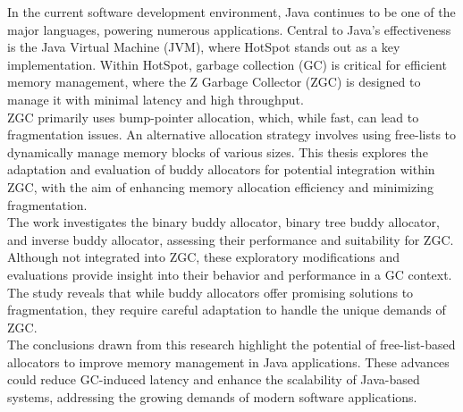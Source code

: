 In the current software development environment, Java continues to be one of the major languages, powering numerous applications. Central to Java's effectiveness is the Java Virtual Machine (JVM), where HotSpot stands out as a key implementation. Within HotSpot, garbage collection (GC) is critical for efficient memory management, where the Z Garbage Collector (ZGC) is designed to manage it with minimal latency and high throughput. \\

ZGC primarily uses bump-pointer allocation, which, while fast, can lead to fragmentation issues. An alternative allocation strategy involves using free-lists to dynamically manage memory blocks of various sizes. This thesis explores the adaptation and evaluation of buddy allocators for potential integration within ZGC, with the aim of enhancing memory allocation efficiency and minimizing fragmentation. \\

The work investigates the binary buddy allocator, binary tree buddy allocator, and inverse buddy allocator, assessing their performance and suitability for ZGC. Although not integrated into ZGC, these exploratory modifications and evaluations provide insight into their behavior and performance in a GC context. The study reveals that while buddy allocators offer promising solutions to fragmentation, they require careful adaptation to handle the unique demands of ZGC. \\

The conclusions drawn from this research highlight the potential of free-list-based allocators to improve memory management in Java applications. These advances could reduce GC-induced latency and enhance the scalability of Java-based systems, addressing the growing demands of modern software applications.


